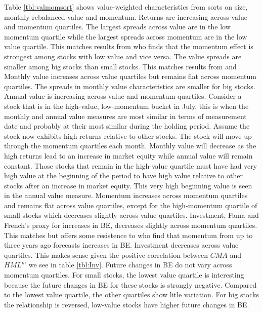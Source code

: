 Table \ref{tbl:valmomsort} shows value-weighted characteristics from sorts on size,
monthly rebalanced value and momentum. Returns are increasing across value and momentum
quartiles. The largest spreads across value are in the low momentum quartile while the
largest spreads across momentum are in the low value quartile. This matches results from
\textcite{asness1997interaction} who finds that the momentum effect is strongest among
stocks with low value and vice versa. The value spreads are smaller among big stocks than
small stocks. This matches results from \textcite{asness2015fact} and
\textcite{kok2017facts}. Monthly value increases across value quartiles but remains flat
across momentum quartiles. The spreads in monthly value characteristics are smaller for
big stocks. Annual value is increasing across value and momentum quartiles. Consider a
stock that is in the high-value, low-momentum bucket in July, this is when the monthly and
annual value measures are most similar in terms of measurement date and probably at their
most similar during the holding period. Assume the stock now exhibits high returns
relative to other stocks. The stock will move up through the momentum quartiles each
month. Monthly value will decrease as the high returns lead to an increase in market
equity while annual value will remain constant. Those stocks that remain in the high-value
quartile must have had very high value at the beginning of the period to have high value
relative to other stocks after an increase in market equity. This very high beginning
value is seen in the annual value measure. Momentum increases across momentum quartiles
and remains flat across value quartiles, except for the high-momentum quartile of small
stocks which decreases slightly across value quartiles. Investment, Fama and French's
proxy for increases in BE, decreases slightly across momentum quartiles. This matches
\textcite{fama2016dissecting} but offers some resistence to \textcite{asness2013devil} who
find that momentum from up to three years ago forecasts increases in BE. Investment
decreases across value quartiles. This makes sense given the positive correlation between
$CMA$ and $HML^m$ we see in table \ref{tbl:Inv}. Future changes in BE do not vary across
momentum quartiles. For small stocks, the lowest value quartile is interesting because the
future changes in BE for these stocks is strongly negative. Compared to the lowest value
quartile, the other quartiles show litle variation. For big stocks the relationship is
reversed, low-value stocks have higher future changes in BE.

